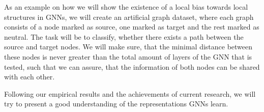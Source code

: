 \documentclass[11pt, dvipsnames, DIV=12]{scrreprt}
\theoremstyle{definition}
\begin{document}
As an example on how we will show the existence of a local bias towards local structures in GNNs, we will create an artificial graph dataset, where each graph consists of a node marked as source, one marked as target and the rest marked as neutral. The task will be to classify, whether there exists a path between the source and target nodes. We will make sure, that the minimal distance between these nodes is never greater than the total amount of layers of the GNN that is tested, such that we can assure, that the information of both nodes can be shared with each other.



Following our empirical results and the achievements of current research, we will try to present a good understanding of the representations GNNs learn.



\end{document}
